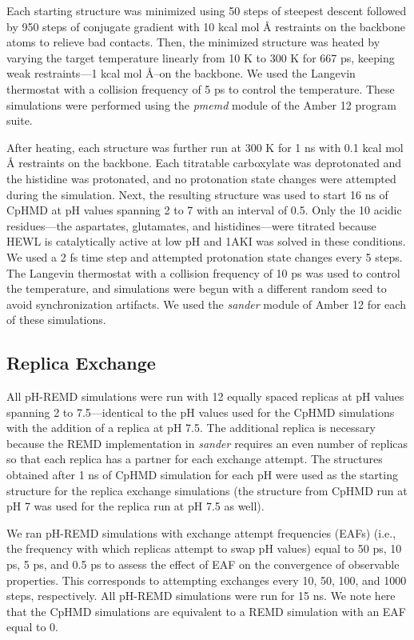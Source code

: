 Each starting structure was minimized using 50 steps of steepest descent
followed by 950 steps of conjugate gradient with 10 kcal mol
\AA{} restraints on the backbone atoms to relieve bad contacts. Then,
the minimized structure was heated by varying the target temperature linearly
from 10 K to 300 K for 667 ps, keeping weak restraints---1 kcal mol
\AA{}--on the backbone. We used the Langevin thermostat with a
collision frequency of 5 ps to control the temperature. These
simulations were performed using the \emph{pmemd} module of the Amber 12 program
suite. \cite{AMBER12}

After heating, each structure was further run at 300 K for 1 ns with 0.1 kcal
mol \AA{} restraints on the backbone. Each titratable
carboxylate was deprotonated and the histidine was protonated, and no
protonation state changes were attempted during the simulation. Next, the
resulting structure was used to start 16 ns of CpHMD at pH values spanning 2 to
7 with an interval of 0.5. Only the 10 acidic residues---the aspartates,
glutamates, and histidines---were titrated because HEWL is catalytically active
at low pH \cite{Vocadlo2001} and 1AKI was solved in these conditions. We used a
2 fs time step and attempted protonation state changes every 5 steps. The
Langevin thermostat with a collision frequency of 10 ps was used to
control the temperature, and simulations were begun with a different random seed
to avoid synchronization artifacts. \cite{Sindhikara2009} We used the
\emph{sander} module of Amber 12 for each of these simulations.

\subsection{Replica Exchange}

All pH-REMD simulations were run with 12 equally spaced replicas at pH values
spanning 2 to 7.5---identical to the pH values used for the CpHMD simulations
with the addition of a replica at pH 7.5. The additional replica is necessary
because the REMD implementation in \emph{sander} requires an even number of
replicas so that each replica has a partner for each exchange attempt. The
structures obtained after 1 ns of CpHMD simulation for each pH were used as the
starting structure for the replica exchange simulations (the structure from
CpHMD run at pH 7 was used for the replica run at pH 7.5 as well).

We ran pH-REMD simulations with exchange attempt frequencies (EAFs) (i.e., the
frequency with which replicas attempt to swap pH values) equal to 50
ps, 10 ps, 5 ps, and 0.5 ps to assess
the effect of EAF on the convergence of observable properties. This corresponds
to attempting exchanges every 10, 50, 100, and 1000 steps, respectively. All
pH-REMD simulations were run for 15 ns. We note here that the CpHMD simulations
are equivalent to a REMD simulation with an EAF equal to 0.

